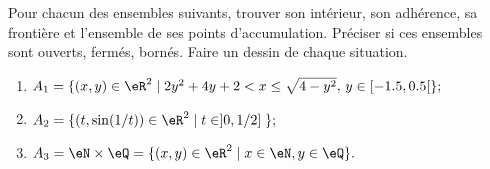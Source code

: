 \begin{exercice}\label{exodevoir1-0001}

Pour chacun des ensembles suivants, trouver son intérieur, son adhérence, sa frontière et l'ensemble de ses points d'accumulation. Préciser si ces ensembles sont ouverts, fermés, bornés. Faire un dessin de chaque situation.

	\begin{enumerate}
		\item	
 $A_1 = \{ (x, y ) \in \eR^2 \; | \; 2y^2+4y+2<x\leq \sqrt{4- y^2},\, y\in [-1.5, 0.5[ \} ;$
                \item
$ A_2 = \{ ( t , \sin(1/t) ) \in \eR^2 \; | \; t \in ]0, 1/2] \; \} ; $
                \item
$A_3 = \eN \times \eQ = \{ (x, y ) \in \eR^2 \; | \; x \in \eN , y \in \eQ \}. $
	\end{enumerate}

\end{exercice}
